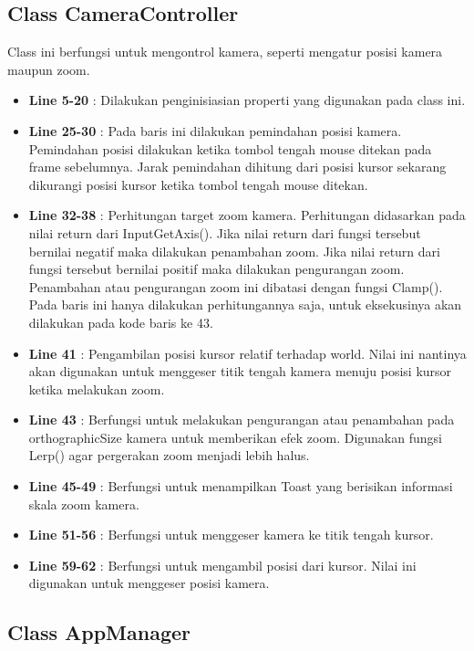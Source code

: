 \documentclass[12pt,a4paper,oneside]{article}
\begin{document}
\subsection{Class CameraController}
Class ini berfungsi untuk mengontrol kamera, seperti mengatur posisi kamera maupun zoom.
\begin{itemize}
	\item \textbf{Line 5-20} : Dilakukan penginisiasian properti yang digunakan pada class ini.
	\item \textbf{Line 25-30} : Pada baris ini dilakukan pemindahan posisi kamera. Pemindahan posisi dilakukan ketika tombol tengah mouse ditekan pada frame sebelumnya. Jarak pemindahan dihitung dari posisi kursor sekarang dikurangi posisi kursor ketika tombol tengah mouse ditekan.
	\item \textbf{Line 32-38} : Perhitungan target zoom kamera. Perhitungan didasarkan pada nilai return dari InputGetAxis(). Jika nilai return dari fungsi tersebut bernilai negatif maka dilakukan penambahan zoom. Jika nilai return dari fungsi tersebut bernilai positif maka dilakukan pengurangan zoom. Penambahan atau pengurangan zoom ini dibatasi dengan fungsi Clamp(). Pada baris ini hanya dilakukan perhitungannya saja, untuk eksekusinya akan dilakukan pada kode baris ke 43.
	\item \textbf{Line 41} : Pengambilan posisi kursor relatif terhadap world. Nilai ini nantinya akan digunakan untuk menggeser titik tengah kamera menuju posisi kursor ketika melakukan zoom.
	\item \textbf{Line 43} : Berfungsi untuk melakukan pengurangan atau penambahan pada orthographicSize kamera untuk memberikan efek zoom. Digunakan fungsi Lerp() agar pergerakan zoom menjadi lebih halus.
	\item \textbf{Line 45-49} : Berfungsi untuk menampilkan Toast yang berisikan informasi skala zoom kamera.
	\item \textbf{Line 51-56} : Berfungsi untuk menggeser kamera ke titik tengah kursor.
	\item \textbf{Line 59-62} : Berfungsi untuk mengambil posisi dari kursor. Nilai ini digunakan untuk menggeser posisi kamera.
\end{itemize}
\subsection{Class AppManager}
\end{document}
